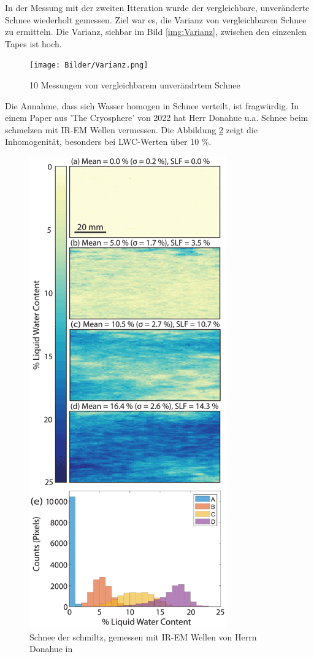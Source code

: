 In der Messung mit der zweiten Itteration wurde der vergleichbare, unveränderte Schnee wiederholt gemessen. Ziel war es, die Varianz von vergleichbarem Schnee zu ermitteln. Die Varianz, sichbar im Bild \ref{img:Varianz}, zwischen den einzenlen Tapes ist hoch.

\begin{figure}
    \centering
    \texttt{[image: Bilder/Varianz.png]}
    \caption{10 Messungen von vergleichbarem unverändrtem Schnee}
    \label{fig:Varianz}
\end{figure}


Die Annahme, dass sich Wasser homogen in Schnee verteilt, ist fragwürdig. In einem Paper aus 'The Cryosphere' von 2022 \cite{Donahue.2022} hat Herr Donahue u.a. Schnee beim schmelzen mit IR-EM Wellen vermessen. Die Abbildung \ref{fig:IRPaper} zeigt die Inhomogenität, besonders bei LWC-Werten über 10 \%.

\begin{figure}[H]
    \centering
    \includegraphics[width=0.8\textheight]{Bilder/tc-16-43-2022-f08-thumb.png}
    \caption{Schnee der schmiltz, gemessen mit IR-EM Wellen von Herrn Donahue in \cite{Donahue.2022}}
    \label{fig:IRPaper}
\end{figure}



